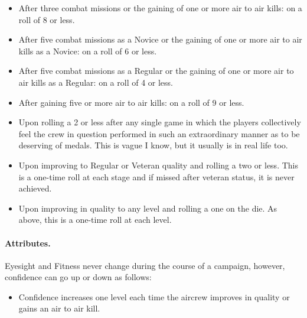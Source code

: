 \begin{advancedrules}
\begin{itemize}

    \item {} After three combat missions or the gaining of one or more air to air kills: on a roll of 8 or less.

    \item {} After five combat missions as a Novice or the gaining of one or more air to air kills as a Novice: on a roll of 6 or less.

    \item {} After five combat missions as a Regular or the gaining of one or more air to air kills as a Regular: on a roll of 4 or less.

    \item {} After gaining five or more air to air kills: on a roll of 9 or less.

    \item {} Upon rolling a 2 or less after any single game in which the players collectively feel the crew in question performed in such an extraordinary manner as to be deserving of medals. This is vague I know, but it usually is in real life too.

    \item {} Upon improving to Regular or Veteran quality and rolling a two or less. This is a one-time roll at each stage and if missed after veteran status, it is never achieved.

    \item {} Upon improving in quality to any level and rolling a one on the die. As above, this is a one-time roll at each level.
    
\end{itemize}

\paragraph{Attributes.} Eyesight and Fitness never change during the course of a campaign, however, confidence can go up or down as follows:
\begin{itemize}

    \item Confidence increases one level each time the aircrew improves in quality or gains an air to air kill.


\end{itemize}
\end{advancedrules}
